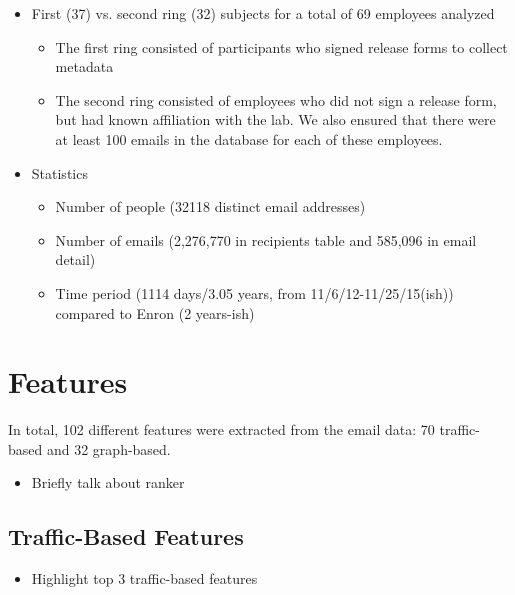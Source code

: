 \documentclass{article}
\begin{document}
\begin{itemize}
\item First (37) vs. second ring (32) subjects for a total of 69 employees analyzed
    \begin{itemize}
    \item The first ring consisted of participants who signed release forms to collect metadata
    \item The second ring consisted of employees who did not sign a release form, but had known affiliation with the lab.  We also ensured that there were at least 100 emails in the database for each of these employees.
    \end{itemize}
\item Statistics
    \begin{itemize}
    \item Number of people (32118 distinct email addresses)
    \item Number of emails (2,276,770 in recipients table and 585,096 in email detail)
    \item Time period (1114 days/3.05 years, from 11/6/12-11/25/15(ish)) compared to Enron (2 years-ish)
    \end{itemize}
\end{itemize}



\section{Features} \label{Features}
In total, 102 different features were extracted from the email data: 70 traffic-based and 32 graph-based.
\begin{itemize}
\item Briefly talk about ranker
\end{itemize}
\subsection{Traffic-Based Features}
\begin{itemize}
\item Highlight top 3 traffic-based features
\end{itemize}
\end{document}

